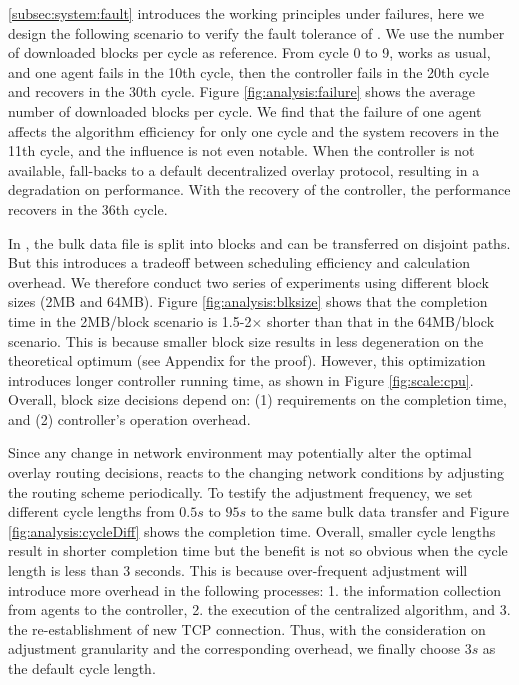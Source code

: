 \label{subsubsec:evaluation:adaptability}

 \Section\ref{subsec:system:fault} introduces the working principles under failures, here we design the following scenario to verify the fault tolerance of \name. We use the number of downloaded blocks per cycle as reference. From cycle 0 to 9, \name works as usual, and one agent fails in the 10th cycle, then the controller fails in the 20th cycle and recovers in the 30th cycle. Figure \ref{fig:analysis:failure} shows the average number of downloaded blocks per cycle. We find that the failure of one agent affects the algorithm efficiency for only one cycle and the system recovers in the 11th cycle, and the influence is not even notable. When the controller is not available, \name fall-backs to a default decentralized overlay protocol, resulting in a degradation on performance. With the recovery of the controller, the performance recovers in the 36th cycle.

 In \name, the bulk data file is split into blocks and can be transferred on disjoint paths. But this introduces a tradeoff between scheduling efficiency and calculation overhead. We therefore conduct two series of experiments using different block sizes (2MB and 64MB). Figure \ref{fig:analysis:blksize} shows that the completion time in the 2MB/block scenario is 1.5-2$\times$ shorter than that in the 64MB/block scenario. This is because smaller block size results in less degeneration on the theoretical optimum (see Appendix for the proof). However, this optimization introduces longer controller running time, as shown in Figure \ref{fig:scale:cpu}. Overall, block size decisions depend on: (1) requirements on the completion time, and (2) controller's operation overhead.

 Since any change in network environment may potentially alter the optimal overlay routing decisions, \name reacts to the changing network conditions by adjusting the routing scheme periodically. To testify the adjustment frequency, we set different cycle lengths from $0.5s$ to $95s$ to the same bulk data transfer and Figure \ref{fig:analysis:cycleDiff} shows the completion time. Overall, smaller cycle lengths result in shorter completion time but the benefit is not so obvious when the cycle length is less than 3 seconds. This is because over-frequent adjustment will introduce more overhead in the following processes: 1. the information collection from agents to the controller, 2. the execution of the centralized algorithm, and 3. the re-establishment of new TCP connection. Thus, with the consideration on adjustment granularity and the corresponding overhead, we finally choose $3s$ as the default cycle length.


